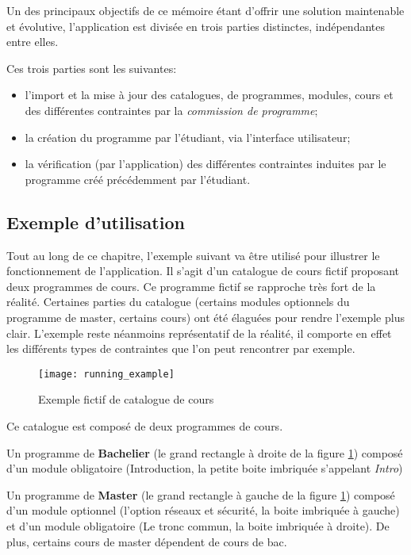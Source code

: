 Un des principaux objectifs de ce mémoire étant d'offrir une solution maintenable et évolutive, l'application est divisée en trois parties distinctes, indépendantes entre elles. 

Ces trois parties sont les suivantes:
\begin{itemize}
\item l'import et la mise à jour des catalogues, de programmes, modules, cours et des différentes contraintes par la \textit{commission de programme}; 
\item la création du programme par l'étudiant, via l'interface utilisateur;
\item la vérification (par l'application) des différentes contraintes induites par le programme créé précédemment par l'étudiant.
\end{itemize}

\subsection{Exemple d'utilisation}

Tout au long de ce chapitre, l'exemple suivant va être utilisé pour illustrer le fonctionnement de l'application. Il s'agit d'un catalogue de cours fictif proposant deux programmes de cours. Ce programme fictif se rapproche très fort de la réalité. Certaines parties du catalogue (certains modules optionnels du programme de master, certains cours) ont été élaguées pour rendre l'exemple plus clair. L'exemple reste néanmoins représentatif de la réalité, il comporte en effet les différents types de contraintes que l'on peut rencontrer par exemple. 
\begin{figure}
\centering
\caption{Exemple fictif de catalogue de cours}
\label{fig:running_example}
\texttt{[image: running\_example]}
\end{figure}

Ce catalogue est composé de deux programmes de cours.

Un programme de \textbf{Bachelier} (le grand rectangle à droite de la figure \ref{fig:running_example}) composé d'un module obligatoire (Introduction, la petite boite imbriquée s’appelant \textit{Intro})

Un programme de \textbf{Master} (le grand rectangle à gauche de la figure \ref{fig:running_example}) composé d'un module optionnel (l'option réseaux et sécurité, la boite imbriquée à gauche) et d'un module obligatoire (Le tronc commun, la boite imbriquée à droite). De plus, certains cours de master dépendent de cours de bac. 


